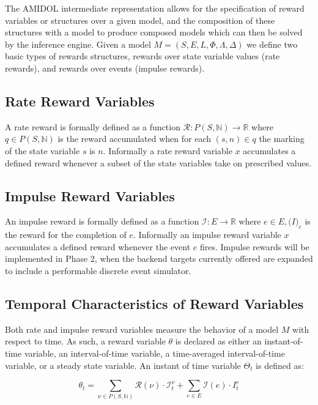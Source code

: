 \documentclass[11pt]{article}
\newcommand{\amidol}{\textsc{AMIDOL}}
\begin{document}
The \amidol{} intermediate representation allows for the specification of reward variables or structures over a given model, and the composition of these structures with a model to produce composed models which can then be solved by the inference engine.  Given a model $M = (S, E, L, \Phi, \Lambda, \Delta)$ we define two basic types of rewards structures, rewards over state variable values (rate rewards), and rewards over events (impulse rewards). \cite{qureshi1996algorithms,deavours1999efficient,ciardo1996well,sanders1991reduced}

\subsection{Rate Reward Variables}

A rate reward is formally defined as a function $\mathcal{R}: P(S, \mathbb{N}) \rightarrow \mathbb{R}$ where $q \in P(S, \mathbb{N})$ is the reward accumulated when for each $(s,n) \in q$ the marking of the state variable $s$ is $n$.  Informally a rate reward variable $x$ accumulates a defined reward whenever a subset of the state variables take on prescribed values.

\subsection{Impulse Reward Variables}

An impulse reward is formally defined as a function $\mathcal{I}: E \rightarrow \mathbb{R}$ where $e \in E, \mathcal(I)_e$ is the reward for the completion of $e$.  Informally an impulse reward variable $x$ accumulates a defined reward whenever the event $e$ fires. Impulse rewards will be implemented in Phase 2, when the backend targets currently offered are expanded to include a performable discrete event simulator.

\subsection{Temporal Characteristics of Reward Variables}

Both rate and impulse reward variables measure the behavior of a model $M$ with respect to time.  As such, a reward variable $\theta$ is declared as either an instant-of-time variable, an interval-of-time variable, a time-averaged interval-of-time variable, or a steady state variable.  An instant of time variable $\Theta_t$ is defined as:

\[ \theta_t = \sum_{\nu \in P(S, \mathbb{N})} \mathcal{R}(\nu) \cdot \mathcal{I}^{\nu}_t + \sum_{e \in E} \mathcal{I}(e) \cdot I_t^e\]
\end{document}
